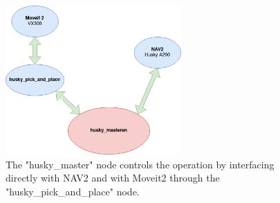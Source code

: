 \begin{figure}[htp]
  \centering
  \includegraphics[width = 0.6\textwidth]{Figures/software_overview.drawio.png}
  \caption{The "husky\_master" node controls the operation by interfacing directly with NAV2 and with Moveit2 through the "husky\_pick\_and\_place" node.}
  \label{fig:husky_master}
\end{figure}
